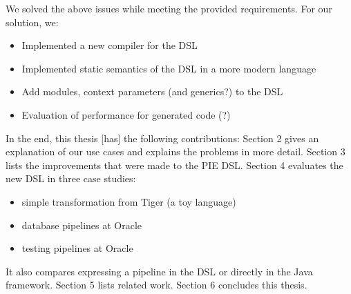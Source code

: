 We solved the above issues while meeting the provided requirements.
For our solution, we:
\begin{itemize}
  \item Implemented a new compiler for the DSL
  \item Implemented static semantics of the \ac{DSL} in a more modern language
  \item Add modules, context parameters (and generics?) to the DSL
  \item Evaluation of performance for generated code (?)
\end{itemize}

In the end, this thesis [has] the following contributions:
Section 2 gives an explanation of our use cases and explains the problems in more detail.
Section 3 lists the improvements that were made to the \ac{PIE} \ac{DSL}.
Section 4 evaluates the new \ac{DSL} in three case studies:
\begin{itemize}
  \item simple transformation from Tiger (a toy language)
  \item database pipelines at Oracle
  \item testing pipelines at Oracle
\end{itemize}
It also compares expressing a pipeline in the \ac{DSL} or directly in the Java framework.
Section 5 lists related work. 
Section 6 concludes this thesis.
